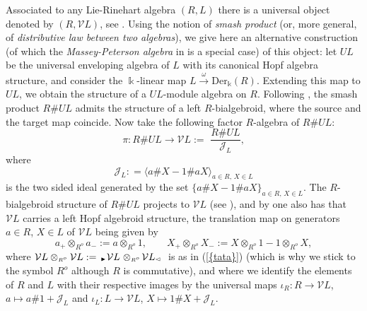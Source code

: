 \documentclass[reqno, a4paper, 10pt]{amsart}
\numberwithin{equation}{section}
\theoremstyle{plain}
\theoremstyle{definition}
\theoremstyle{remark}
\begin{document}
Associated to any Lie-Rinehart algebra $(R, L)$ there is a universal object denoted by $(R,{{\mathcal V}} L)$, see \cite{Rin:DFOGCA, Hue:PCAQ}. 
Using the notion of \emph{smash product} (or, more general, of \emph{distributive law between two algebras}), we give here an alternative construction (of which the {\em Massey-Peterson algebra} in \cite{MasPet:TCSOCFS,Hue:PCAQ} is a special case) of this object:  
let $UL$ be the universal enveloping algebra of $L$ with its canonical Hopf algebra structure, and consider the $\Bbbk$-linear map $L \overset{\omega}{\longrightarrow} 
\mathrm{Der}_{\Bbbk}(R)$. 
Extending this map to $UL$, we obtain the structure of a $UL$-module algebra on $R$. Following \cite[pp.~117--118]{Swe:GOSA}, the smash product $R\# UL$ admits the structure of a left $R$-bialgebroid, where the source and the target map coincide.  
Now take the following factor $R$-algebra of $R\# UL$:
$$
\pi: R\# UL \longrightarrow {{\mathcal V}} L:=\,\, \frac{R\# UL}{{{\mathcal J}}_L},
$$
where
$$    
{{\mathcal J}}_L: ={\langle  a \# X - 1\# aX\rangle}_{a \in R,\, X \in L}
$$ 
is the two sided ideal generated by the set $\{a \# X - 1\# aX\}_{a \in R,\, X \in L}$. 
The $R$-bialgebroid structure of  $R\# UL$ projects to ${{\mathcal V}} L$ (see \cite{Xu:QG}), and by  \cite[\S4.2.1]{Kow:HAATCT} one also has that ${{\mathcal V}} L$ carries a left Hopf algebroid structure, the 
translation map on generators $a \in R$, $X \in L$ of ${{\mathcal V}} L$ being given by
$$
a_{+}{\otimes_{\scriptscriptstyle{{\scriptscriptstyle{{R^{o}}}}}}} a_{-} := a{\otimes_{\scriptscriptstyle{{\scriptscriptstyle{{R^{o}}}}}}} 1, \qquad  X_{+}{\otimes_{\scriptscriptstyle{{\scriptscriptstyle{{R^{o}}}}}}}X_{-}:= X{\otimes_{\scriptscriptstyle{{\scriptscriptstyle{{R^{o}}}}}}}1 - 1 {\otimes_{\scriptscriptstyle{{\scriptscriptstyle{{R^{o}}}}}}} X,
$$ 
where ${{\mathcal V}} L \otimes_{{\scriptscriptstyle{{R^{o}}}}} {{\mathcal V}} L := {{}_{{{{\,\raise1pt\hbox{$\scriptscriptstyle{\blacktriangleright}$} \, }} \!}} {{{{\mathcal V}} L}}_{{\! {}}}\,} \otimes_{{\scriptscriptstyle{{R^{o}}}}} {{}_{{{} \!}} {{{{\mathcal V}} L}}_{{\! {{\,\raise1pt\hbox{$\scriptscriptstyle{\lhd}$} \, }}}}\,}$  is as in {{\rm (}\ref{{tata}}{\rm )}} (which is why we stick to the symbol ${{R^{o}}}$ although $R$ is commutative), and where we identify the elements of $R$ and $L$ with their respective images by the universal  maps $\iota_R: R \to {{\mathcal V}} L$, $a \mapsto a\# 1 + {{\mathcal J}}_L$ 
and $\iota_L: L \to {{\mathcal V}} L$, $X \mapsto 1\# X +{{\mathcal J}}_L$.
\end{document}
